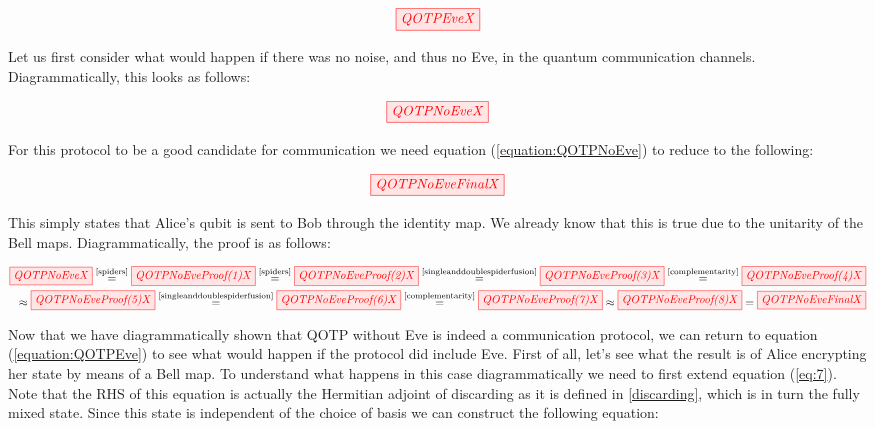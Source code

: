 \documentclass[]{article}
\newcommand{\equaltext}[1]{\ensuremath{\stackrel{\text{#1}}{=}}}
\begin{document}
\begin{equation}
\tikzfig{QOTPEveX}
\label{equation:QOTPEve}
\end{equation}

Let us first consider what would happen if there was no noise, and thus no Eve, in the quantum communication channels. Diagrammatically, this looks as follows:

\begin{equation}
	\tikzfig{QOTPNoEveX}
	\label{equation:QOTPNoEve}
\end{equation}

For this protocol to be a good candidate for communication we need equation (\ref{equation:QOTPNoEve}) to reduce to the following: 

\begin{equation}
	\tikzfig{QOTPNoEveFinalX}
\end{equation}

This simply states that Alice's qubit is sent to Bob through the identity map. We already know that this is true due to the unitarity of the Bell maps. Diagrammatically, the proof is as follows:

\begin{equation}
	\begin{split}
	\tikzfig{QOTPNoEveX} \equaltext{\ref{spiders}} 
	\tikzfig{QOTPNoEveProof(1)X} \equaltext{\ref{spiders}}
	\tikzfig{QOTPNoEveProof(2)X} \equaltext{\ref{singleanddoublespiderfusion}}
	\tikzfig{QOTPNoEveProof(3)X} \equaltext{\ref{complementarity}}
	\tikzfig{QOTPNoEveProof(4)X} \\ \approx
	\tikzfig{QOTPNoEveProof(5)X} \equaltext{\ref{singleanddoublespiderfusion}}
	\tikzfig{QOTPNoEveProof(6)X} \equaltext{\ref{complementarity}}
	\tikzfig{QOTPNoEveProof(7)X} \approx
	\tikzfig{QOTPNoEveProof(8)X} =
	\tikzfig{QOTPNoEveFinalX}
	\end{split}
\end{equation}

Now that we have diagrammatically shown that QOTP without Eve is indeed a communication protocol, we can return to equation (\ref{equation:QOTPEve}) to see what would happen if the protocol did include Eve. First of all, let's see what the result is of Alice encrypting her state by means of a Bell map. To understand what happens in this case diagrammatically we need to first extend equation (\ref{eq:7}). Note that the RHS of this equation is actually the Hermitian adjoint of discarding as it is defined in \ref{discarding}, which is in turn the fully mixed state. Since this state is independent of the choice of basis we can construct the following equation:
\end{document}
